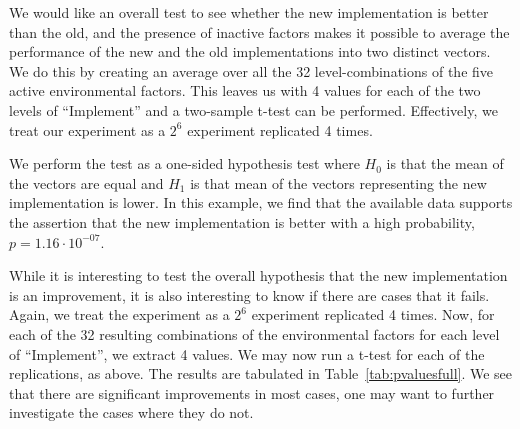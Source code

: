 \documentclass{llncs}
\begin{document}
We would like an overall test to see whether the new implementation is
better than the old, and the presence of inactive factors makes it
possible to average the performance of the new and the old
implementations into two distinct vectors. We do this by creating an
average over all the 32 level-combinations of the five active
environmental factors. This leaves us with 4 values for each of the
two levels of ``Implement'' and a two-sample t-test can be
performed. Effectively, we treat our experiment as a $2^6$ experiment
replicated 4 times.

We perform the test as a one-sided hypothesis test where $H_0$ is that
the mean of the vectors are equal and $H_1$ is that mean of the
vectors representing the new implementation is lower. In this example,
we find that the available data supports the assertion that the new
implementation is better with a high probability, $p=1.16 \cdot
10^{-07}$.

While it is interesting to test the overall hypothesis that the new
implementation is an improvement, it is also interesting to know if
there are cases that it fails. Again, we treat the experiment as a
$2^6$ experiment replicated 4 times. Now, for each of the 32 resulting
combinations of the environmental factors for each level of
``Implement'', we extract 4 values. We may now run a t-test for each
of the replications, as above. The results are tabulated in
Table~\ref{tab:pvaluesfull}. We see that there are significant
improvements in most cases, one may want to further investigate the
cases where they do not.
\end{document}
